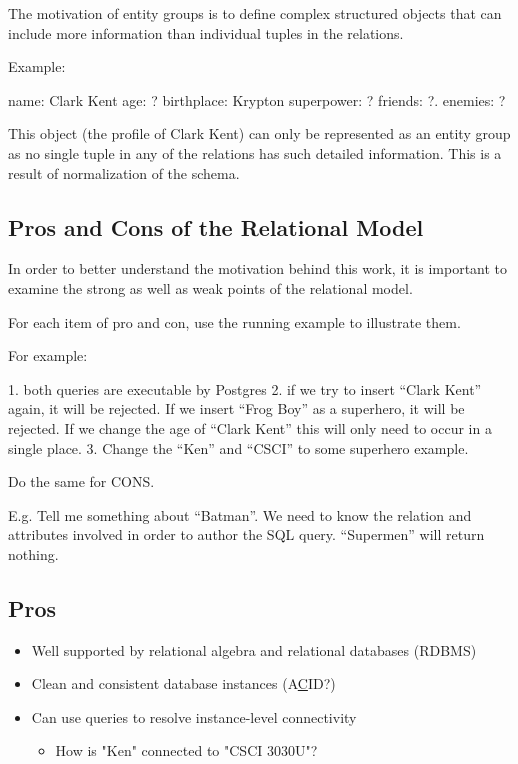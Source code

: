 		The motivation of entity groups is to define complex structured objects that can include more information than individual tuples in the relations.
		
		Example:
		
		name: Clark Kent
		age: ?
		birthplace: Krypton
		superpower: ?
		friends: ?.
		enemies: ?
		
		This object (the profile of Clark Kent) can only be represented as an entity group as no single tuple in any of the relations has such detailed information.  This is a result of normalization of the schema.

	\subsection{Pros and Cons of the Relational Model}
		In order to better understand the motivation behind this work, it is important to examine the strong as well as weak points of the relational model.
		
		For each item of pro and con, use the running example to illustrate them.
		
		For example:
		
		1. both queries are executable by Postgres
		2. if we try to insert ``Clark Kent'' again, it will be rejected.  If we insert ``Frog Boy'' as a superhero, it will be rejected.  If we change the age of ``Clark Kent'' this will only need to occur in a single place.
		3. Change the ``Ken'' and ``CSCI'' to some superhero example.
		
		Do the same for CONS.
		
		E.g. Tell me something about ``Batman''.  We need to know the relation and attributes involved in order to author the SQL query.  ``Supermen'' will return nothing.
		
		\subsection{Pros}
			\begin{itemize}
				\item Well supported by relational algebra and relational databases (RDBMS)
				\item Clean and consistent database instances (A\underline{C}ID?)
				\item Can use queries to resolve instance-level connectivity
					\begin{itemize}
						\item How is "Ken" connected to "CSCI 3030U"?
					\end{itemize}
			\end{itemize}
		
